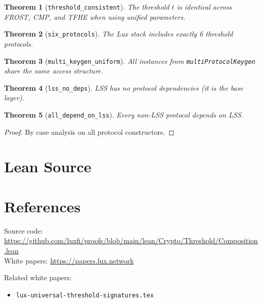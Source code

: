\documentclass[11pt]{article}
\newtheorem{theorem}{Theorem}
\begin{document}
\begin{theorem}[\texttt{threshold\_consistent}]
The threshold $t$ is identical across FROST, CMP, and TFHE when using unified parameters.
\end{theorem}

\begin{theorem}[\texttt{six\_protocols}]
The Lux stack includes exactly 6 threshold protocols.
\end{theorem}

\begin{theorem}[\texttt{multi\_keygen\_uniform}]
All instances from \texttt{multiProtocolKeygen} share the same access structure.
\end{theorem}

\begin{theorem}[\texttt{lss\_no\_deps}]
LSS has no protocol dependencies (it is the base layer).
\end{theorem}

\begin{theorem}[\texttt{all\_depend\_on\_lss}]
Every non-LSS protocol depends on LSS.
\end{theorem}
\begin{proof}
By case analysis on all protocol constructors.
\end{proof}


\section{Lean Source}


\section{References}
\noindent Source code: \url{https://github.com/luxfi/proofs/blob/main/lean/Crypto/Threshold/Composition.lean}\\
\noindent White papers: \url{https://papers.lux.network}

\noindent Related white papers:
\begin{itemize}
  \item \texttt{lux-universal-threshold-signatures.tex}
\end{itemize}
\end{document}

